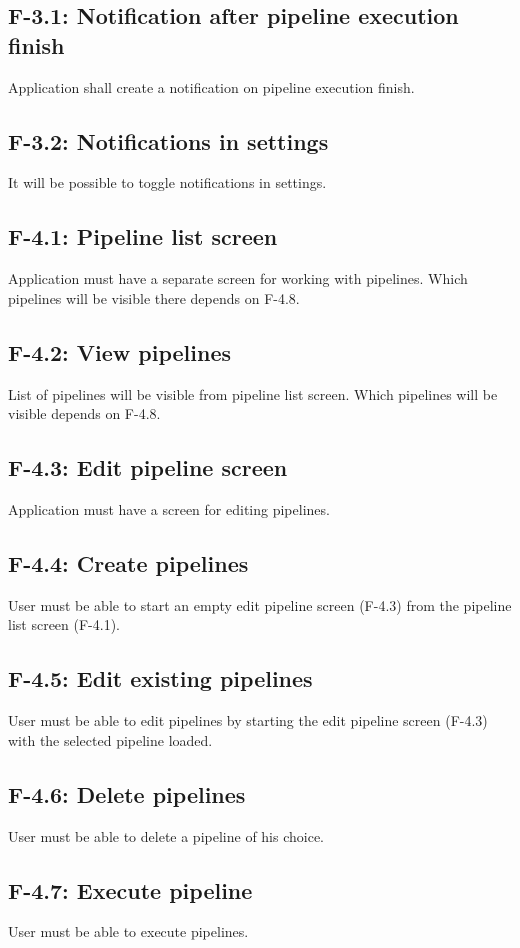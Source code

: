 \subsection*{F-3.1: Notification after pipeline execution finish}
\label{subsec:notifications}
Application shall create a notification on pipeline execution finish.
\subsection*{F-3.2: Notifications in settings}
It will be possible to toggle notifications in settings.
\subsection*{F-4.1: Pipeline list screen}
Application must have a separate screen for working with pipelines. Which pipelines will be visible there depends on F-4.8.
\subsection*{F-4.2: View pipelines}
List of pipelines will be visible from pipeline list screen. Which pipelines will be visible depends on F-4.8.
\subsection*{F-4.3: Edit pipeline screen}
\label{subsec:editpipelinescreen}
Application must have a screen for editing pipelines.
\subsection*{F-4.4: Create pipelines}
User must be able to start an empty edit pipeline screen (F-4.3) from the pipeline list screen (F-4.1).
\subsection*{F-4.5: Edit existing pipelines}
User must be able to edit pipelines by starting the edit pipeline screen (F-4.3) with the selected pipeline loaded.
\subsection*{F-4.6: Delete pipelines}
User must be able to delete a pipeline of his choice.
\subsection*{F-4.7: Execute pipeline}
User must be able to execute pipelines.
